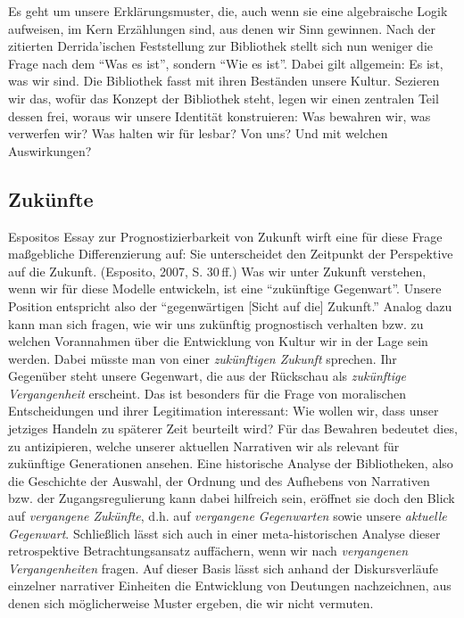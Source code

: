 \documentclass[output=paper]{langscibook}
\begin{document}
Es geht um unsere Erklärungsmuster, die, auch wenn sie eine algebraische
Logik aufweisen, im Kern Erzählungen sind, aus denen wir Sinn gewinnen.
Nach der zitierten Derrida'ischen Feststellung zur Bibliothek stellt
sich nun weniger die Frage nach dem \enquote{Was es ist}, sondern
\enquote{Wie es ist}. Dabei gilt allgemein: Es ist, was wir sind. Die
Bibliothek fasst mit ihren Beständen unsere Kultur. Sezieren wir das,
wofür das Konzept der Bibliothek steht, legen wir einen zentralen Teil
dessen frei, woraus wir unsere Identität konstruieren: Was bewahren wir,
was verwerfen wir? Was halten wir für lesbar? Von uns? Und mit welchen
Auswirkungen?

\hypertarget{zukuxfcnfte}{%
\subsection*{Zukünfte}\label{zukuxfcnfte}}

Espositos Essay zur Prognostizierbarkeit von Zukunft wirft eine für
diese Frage maßgebliche Differenzierung auf: Sie unterscheidet den
Zeitpunkt der Perspektive auf die Zukunft. (Esposito, 2007, S. 30\,ff.)
Was wir unter Zukunft verstehen, wenn wir für diese Modelle entwickeln,
ist eine \enquote{zukünftige Gegenwart}. Unsere Position entspricht also
der \enquote{gegenwärtigen {[}Sicht auf die{]} Zukunft.} Analog dazu
kann man sich fragen, wie wir uns zukünftig prognostisch verhalten bzw.
zu welchen Vorannahmen über die Entwicklung von Kultur wir in der Lage
sein werden. Dabei müsste man von einer \emph{zukünftigen Zukunft}
sprechen. Ihr Gegenüber steht unsere Gegenwart, die aus der Rückschau
als \emph{zukünftige Vergangenheit} erscheint. Das ist besonders für die
Frage von moralischen Entscheidungen und ihrer Legitimation interessant:
Wie wollen wir, dass unser jetziges Handeln zu späterer Zeit beurteilt
wird? Für das Bewahren bedeutet dies, zu antizipieren, welche unserer
aktuellen Narrativen wir als relevant für zukünftige Generationen
ansehen. Eine historische Analyse der Bibliotheken, also die Geschichte
der Auswahl, der Ordnung und des Aufhebens von Narrativen bzw. der
Zugangsregulierung kann dabei hilfreich sein, eröffnet sie doch den
Blick auf \emph{vergangene Zukünfte}, d.h. auf \emph{vergangene
Gegenwarten} sowie unsere \emph{aktuelle Gegenwart}. Schließlich lässt
sich auch in einer meta-historischen Analyse dieser retrospektive
Betrachtungsansatz auffächern, wenn wir nach \emph{vergangenen
Vergangenheiten} fragen. Auf dieser Basis lässt sich anhand der
Diskursverläufe einzelner narrativer Einheiten die Entwicklung von
Deutungen nachzeichnen, aus denen sich möglicherweise Muster ergeben,
die wir nicht vermuten.
\end{document}
